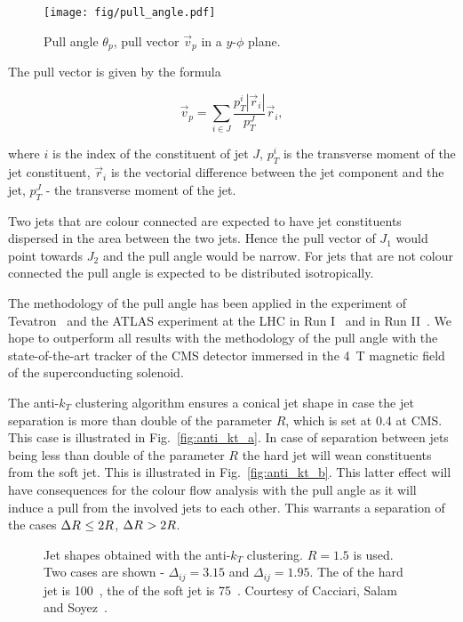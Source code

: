 \begin{figure}[hbtp]
  \centering
  \texttt{[image: fig/pull\_angle.pdf]}
  \caption{Pull angle $\theta_{p}$, pull vector $\vec{v}_{p}$ in a $y$-$\phi$ plane.}
  \label{fig:pull_angle}
\end{figure}

The pull vector is given by the formula

\begin{equation}
  \vec{v}_{p}=\sum_{i\in J}\frac{p^{i}_{T}|\vec{r}_{i}|}{p^{J}_{T}}\vec{r}_{i},
  \label{Eq:pull_angle}
\end{equation}

where $i$ is the index of the constituent of jet $J$, $p^{i}_{T}$ is the transverse moment of the jet constituent, $\vec{r}_{i}$ is the vectorial difference between the jet component and the jet, $p^{J}_{T}$ - the transverse moment of the jet.

Two jets that are colour connected are expected to have jet constituents dispersed in the area between the two jets. Hence the pull vector of $J_{1}$ would point towards $J_{2}$ and the pull angle would be narrow. For jets that are not colour connected the pull angle is expected to be distributed isotropically.

The methodology of the pull angle has been applied in the \DZERO experiment of Tevatron~\cite{Abazov:2011vh} and the ATLAS experiment at the LHC in Run I~\cite{Aad:2015lxa} and in Run II~\cite{ATLAS:2017iaz}. We hope to outperform all results with the methodology of the pull angle with the state-of-the-art tracker of the CMS detector immersed in the 4~T magnetic field of the superconducting solenoid.

The anti-$k_{T}$ clustering algorithm ensures a conical jet shape in case the jet separation \DeltaR is more than double of the parameter $R$, which is set at 0.4 at CMS. This case is illustrated in Fig.~\ref{fig:anti_kt_a}. In case of separation between jets \DeltaR being less than double of the parameter $R$ the hard jet will wean constituents from the soft jet. This is illustrated in Fig.~\ref{fig:anti_kt_b}. This latter effect will have consequences for the colour flow analysis with the pull angle as it will induce a pull from the involved jets to each other. This warrants a separation of the cases $\Delta R^{}\leq2R$, $\Delta R^{}>2R$. 

\begin{figure}[hbtp]
  \def\twidth{0.5}
   \caption{Jet shapes obtained with the anti-$k_{T}$ clustering. $R=1.5$ is used. Two cases are shown - $\Delta_{ij}=3.15$ and  $\Delta_{ij}=1.95$. The \pt of the hard jet is 100~\GeV, the \pt of the soft jet is 75~\GeV. Courtesy of Cacciari, Salam and Soyez~\cite{github:antikt}.}
  \label{fig:anti_kt}
\end{figure}


